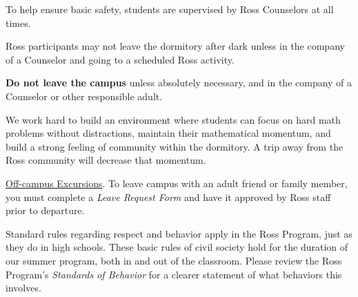 \documentclass{ross}
\begin{document}
To help ensure basic safety, students are supervised 
by Ross Counselors at all times.

Ross participants may not leave the dormitory after dark unless 
in the company of a Counselor and going to a scheduled Ross activity.

\textbf{Do not leave the campus} unless absolutely necessary, and in
the company of a Counselor or other responsible adult.

We work hard to build an environment where students can focus on hard math problems
without distractions, maintain their mathematical momentum, 
and build a strong feeling of community within the dormitory. 
A trip away from the Ross community will decrease that momentum.

\underline{Off-campus Excursions}.  To leave campus with
an adult friend or family member, you must complete a {\it Leave Request Form} 
and have it approved by Ross staff prior to departure.

Standard rules regarding respect and behavior apply in the Ross
Program, just as they do in high schools. These basic rules of civil society hold 
for the duration of our summer program, both in and out of the classroom. 
Please review the Ross Program's \textit{Standards of Behavior} for
a clearer statement of what behaviors this involves.
\end{document}
